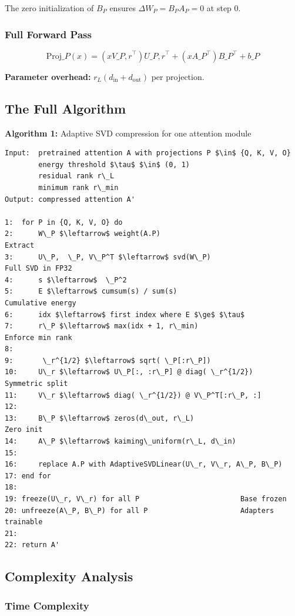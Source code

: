 The zero initialization of $B_P$ ensures $\Delta W_P = B_P A_P = 0$ at step 0.

\subsubsection{Full Forward Pass}

\[
\text{Proj}\_P(x) = (x V\_{P, r}^\top) U\_{P, r}^\top + (x A\_P^\top) B\_P^\top + b\_P
\tag{4.9}
\]

\textbf{Parameter overhead:} $r_L (d_\text{in} + d_\text{out})$ per projection.

\subsection{The Full Algorithm}

\textbf{Algorithm 1:} Adaptive SVD compression for one attention module
\begin{lstlisting}
Input:  pretrained attention A with projections P $\in$ {Q, K, V, O}
        energy threshold $\tau$ $\in$ (0, 1)
        residual rank r\_L
        minimum rank r\_min
Output: compressed attention A'

1:  for P in {Q, K, V, O} do
2:      W\_P $\leftarrow$ weight(A.P)                              Extract
3:      U\_P,  \_P, V\_P^T $\leftarrow$ svd(W\_P)                     Full SVD in FP32
4:      s $\leftarrow$  \_P^2
5:      E $\leftarrow$ cumsum(s) / sum(s)                        Cumulative energy
6:      idx $\leftarrow$ first index where E $\ge$ $\tau$
7:      r\_P $\leftarrow$ max(idx + 1, r\_min)                     Enforce min rank
8:
9:       \_r^{1/2} $\leftarrow$ sqrt( \_P[:r\_P])
10:     U\_r $\leftarrow$ U\_P[:, :r\_P] @ diag( \_r^{1/2})          Symmetric split
11:     V\_r $\leftarrow$ diag( \_r^{1/2}) @ V\_P^T[:r\_P, :]
12:
13:     B\_P $\leftarrow$ zeros(d\_out, r\_L)                       Zero init
14:     A\_P $\leftarrow$ kaiming\_uniform(r\_L, d\_in)
15:
16:     replace A.P with AdaptiveSVDLinear(U\_r, V\_r, A\_P, B\_P)
17: end for
18:
19: freeze(U\_r, V\_r) for all P                        Base frozen
20: unfreeze(A\_P, B\_P) for all P                      Adapters trainable
21:
22: return A'
\end{lstlisting}

\subsection{Complexity Analysis}

\subsubsection{Time Complexity}

